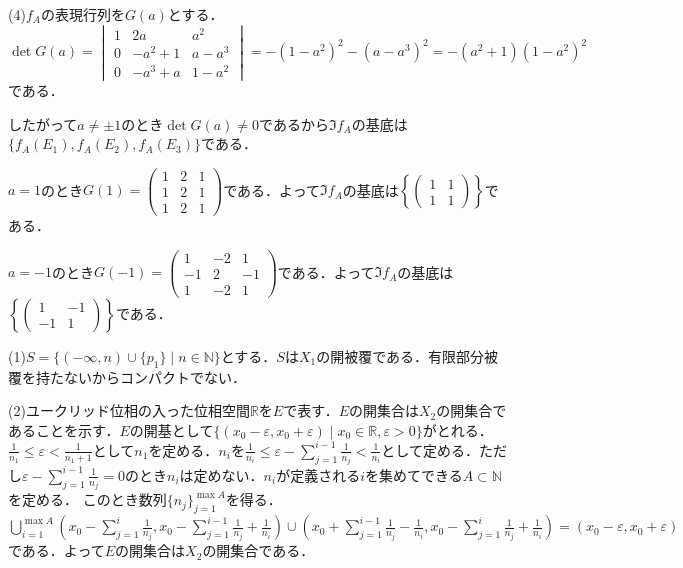 \documentclass[
		book,
		head_space=20mm,
		foot_space=20mm,
		gutter=10mm,
		line_length=190mm
]{jlreq}
\begin{document}
(4)$f_A$の表現行列を$G(a)$とする．
$\det G(a)=\begin{vmatrix}
    1 & 2a & a^2 \\
    0 & -a^2+1 & a-a^3 \\
    0 & -a^3+a & 1-a^2
    \end{vmatrix}=-(1-a^2)^2-(a-a^3)^2=-(a^2+1)(1-a^2)^2$である．

したがって$a\neq\pm{1}$のとき$\det G(a)\neq0$であるから$\Im f_A$の基底は$\{f_A(E_1),f_A(E_2),f_A(E_3)\}$である．

$a=1$のとき$G(1)=\begin{pmatrix}
    1 & 2 & 1 \\
    1 & 2 & 1 \\
    1 & 2 & 1
    \end{pmatrix}$である．よって$\Im f_A$の基底は$\left\{\begin{pmatrix}
    1 & 1 \\
    1 & 1
    \end{pmatrix}\right\}$である．

$a=-1$のとき$G(-1)=\begin{pmatrix}
    1 & -2 & 1 \\
    -1 & 2 & -1 \\
    1 & -2 & 1
    \end{pmatrix}$である．よって$\Im f_A$の基底は$\left\{\begin{pmatrix}
    1 & -1 \\
    -1 & 1
    \end{pmatrix}\right\}$である．

(1)$S=\{ (-\infty,n)\cup\{p_1\} \mid n\in \mathbb{N}\}$とする．$S$は$X_1$の開被覆である．有限部分被覆を持たないからコンパクトでない．

(2)ユークリッド位相の入った位相空間$\mathbb{R}$を$E$で表す．$E$の開集合は$X_2$の開集合であることを示す．$E$の開基として$\{(x_0-\varepsilon,x_0+\varepsilon)\mid x_0\in \mathbb{R},\varepsilon>0\}$がとれる．$\frac{1}{n_1}\le\varepsilon<\frac{1}{n_1+1}$として$n_1$を定める．$n_{i}$を$\frac{1}{n_i}\le \varepsilon-\sum\limits_{j=1}^{i-1}\frac{1}{n_j}<\frac{1}{n_i}$として定める．ただし$\varepsilon-\sum\limits_{j=1}^{i-1}\frac{1}{n_j}=0$のとき$n_i$は定めない．$n_i$が定義される$i$を集めてできる$A \subset \mathbb{N}$を定める． このとき数列$\{n_j\}_{j=1}^{\max A}$を得る．$\bigcup\limits_{i=1}^{\max A} (x_0-\sum\limits_{j=1}^{i}\frac{1}{n_j},x_0-\sum\limits_{j=1}^{i-1}\frac{1}{n_j}+\frac{1}{n_i})\cup(x_0+\sum\limits_{j=1}^{i-1}\frac{1}{n_j}-\frac{1}{n_i},x_0-\sum\limits_{j=1}^{i}\frac{1}{n_j}+\frac{1}{n_i})=(x_0-\varepsilon,x_0+\varepsilon)$である．よって$E$の開集合は$X_2$の開集合である．
\end{document}
